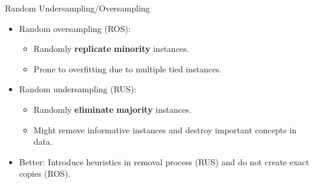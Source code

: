\documentclass[10pt,compress,t,notes=noshow, xcolor=table]{beamer}
\begin{document}
\begin{frame}{Random Undersampling/Oversampling}

    \begin{itemize}
        \item Random oversampling (ROS):
        \begin{itemize}
            \item Randomly \textbf{replicate} \textbf{minority} instances.%
            \item Prone to overfitting due to multiple tied instances.
        \end{itemize}

        \item Random undersampling (RUS):
        \begin{itemize}
            \item Randomly \textbf{eliminate} \textbf{majority} instances. %
            \item Might remove informative instances and destroy important concepts in data.
        \end{itemize}

        \item Better: Introduce heuristics in removal process (RUS) and do not create exact copies (ROS).
    
        \end{itemize}	

\end{frame}
	
\end{document}
